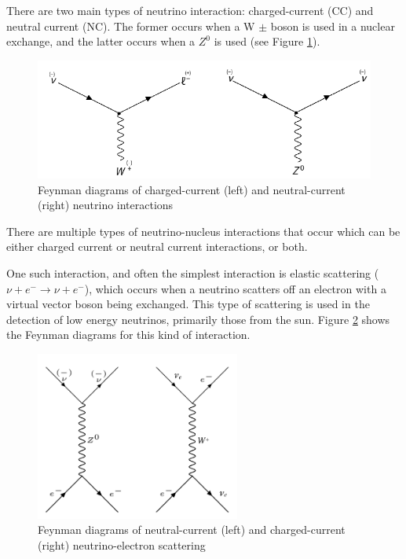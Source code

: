There are two main types of neutrino interaction: charged-current (CC) and neutral current (NC). The former occurs when a W $\pm$ boson is used in a nuclear exchange, and the latter occurs when a $Z^{0}$ is used (see Figure \ref{fig:CC_NC}).

\begin{figure}
    \includegraphics[width=\textwidth]{Figures/CC_NC.png}
    \caption{Feynman diagrams of charged-current (left) and neutral-current (right) neutrino interactions}
    \label{fig:CC_NC}
\end{figure}

There are multiple types of neutrino-nucleus interactions that occur which can be either charged current or neutral current interactions, or both. 

One such interaction, and often the simplest interaction is elastic scattering ($\nu+e^{-} \rightarrow \nu+e^{-}$), which occurs when a neutrino scatters off an electron with a virtual vector boson being exchanged. This type of scattering is used in the detection of low energy neutrinos, primarily those from the sun. Figure \ref{fig:elastic_scattering} shows the Feynman diagrams for this kind of interaction.

\begin{figure}
    \centering
    \includegraphics[width=0.6\textwidth]{Figures/elastic_scattering.png}
    \caption{Feynman diagrams of neutral-current (left) and charged-current (right) neutrino-electron scattering}
    \label{fig:elastic_scattering}
\end{figure}

